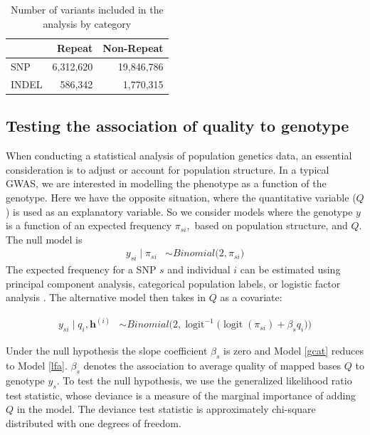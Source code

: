 \documentclass[custompaper]{MBE}%
\newcommand{\logit}{\operatorname{logit}}
\begin{document}
\begin{table}[h]
\begin{tabular}{l  r r}
                      & {Repeat}  & {Non-Repeat}       \\ \hline
{SNP}  & 6,312,620 & 19,846,786   \\  
{INDEL} &  586,342  & 1,770,315 \\ \hline
\end{tabular}
\caption{Number of variants included in the analysis by category}
\label{totTable}
\end{table}

\subsection{Testing the association of quality to genotype}
When conducting a statistical analysis of population genetics data, an essential consideration is  to adjust or account for population structure. In a typical GWAS, we are interested in modelling the phenotype as a function of the genotype. 
Here we have the opposite situation, where the quantitative variable ($Q$) is used as an explanatory variable. 
So we consider models where the genotype $y$ is a function of an expected frequency $\pi_{si},$ based on population structure, and $Q$. 
The null model is 
\begin{align} \label{lfa}
y_{si} \mid \pi_{si}  &\sim Binomial\big( 2, \pi_{si} \big)
\end{align} 
The expected frequency for a SNP $s$ and individual $i$ can be estimated using principal component analysis, categorical population labels, or logistic factor analysis \citep{song2015testing}. The alternative model then takes in $Q$ as a covariate: 

\begin{align}\label{gcat}
 y_{si} \mid q_i, \boldsymbol{h}^{(i)} &\sim Binomial\bigg( 2, \logit^{-1}\Big(\logit(\pi_{si}) + \beta_s q_i\Big) \bigg)
\end{align} 

Under the null hypothesis the slope coefficient $\beta_s$ is zero and Model \ref{gcat} reduces to Model \ref{lfa}. 
$\beta_s$ denotes the association to average quality of mapped bases $Q$ to genotype $y_{s}$. 
To test the null hypothesis, we use the generalized likelihood ratio test statistic, whose deviance is a measure of the marginal importance of adding $Q$ in the model. 
The deviance test statistic is approximately chi-square distributed with one degrees of freedom.
\end{document}
